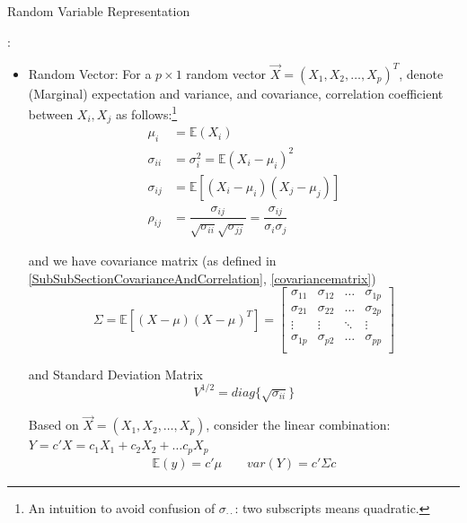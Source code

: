 \begin{point}
    \hypertarget{RandomVariableRepresentation}{Random Variable Representation}:
\end{point}
    \begin{itemize}[topsep=6pt,itemsep=4pt]
    \item Random Vector: For a $ p\times 1 $ random vector $ \vec{X}=(X_{1},X_{2},\ldots,X_{p})^T  $, denote (Marginal) expectation and variance, and covariance, correlation coefficient between $ X_i,X_j $ as follows:\footnote{An intuition to avoid confusion of $ \sigma _{\cdot \cdot } $: two subscripts means quadratic.}
    \begin{align}
        \mu_i&=\mathbb{E}(X_i)\\
        \sigma _{ii}&=\sigma_i ^2=\mathbb{E}(X_i-\mu_i)^2\\
        \sigma_{ij}&=\mathbb{E}[(X_i-\mu_i)(X_j-\mu_j)]\\
        \rho _{ij}&=\dfrac{\sigma _{ij}}{\sqrt{\sigma _{ii}}\sqrt{\sigma _{jj}}}=\dfrac{\sigma _{ij}}{\sigma _i\sigma _j}
    \end{align}
    
    and we have covariance matrix (as defined in \autoref{SubSubSectionCovarianceAndCorrelation}, \autoref{covariancematrix})
    \begin{equation}
        \Sigma =\mathbb{E}[(X-\mu)(X-\mu)^T] =
        \begin{bmatrix}
        \sigma _{11}&\sigma _{12}&\ldots&\sigma _{1p}\\
        \sigma _{21}&\sigma _{22}&\ldots&\sigma _{2p}\\
        \vdots&\vdots&\ddots&\vdots\\
        \sigma _{1p}&\sigma _{p2}&\ldots&\sigma _{pp}\\
        \end{bmatrix}
    \end{equation}

    and Standard Deviation Matrix
    \begin{equation}\label{EqaStandardDeviationMatrix}
        V^{1/2}=diag\{\sqrt{\sigma _{ii}}\} 
    \end{equation}

    Based on $ \vec{X}=(X_{1},X_{2},\ldots,X_{p})  $, consider the linear combination:$ Y=c'X=c_1X_1+c_2X_2+\ldots c_pX_p $
    \begin{align}
        \mathbb{E}(y)=c'\mu\qquad var(Y)=c'\Sigma c
    \end{align}


\end{itemize}
